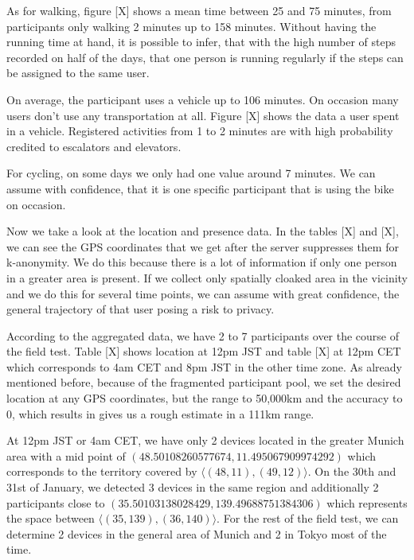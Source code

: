 As for walking, figure [X] shows a mean time between 25 and 75 minutes, from participants only walking 2 minutes up to 158 minutes. Without having the running time at hand, it is possible to infer, that with the high number of steps recorded on half of the days, that one person is running regularly if the steps can be assigned to the same user.

On average, the participant uses a vehicle up to 106 minutes. On occasion many users don't use any transportation at all. Figure [X] shows the data a user spent in a vehicle. Registered activities from 1 to 2 minutes are with high probability credited to escalators and elevators.  

For cycling, on some days we only had one value around 7 minutes. We can assume with confidence, that it is one specific participant that is using the bike on occasion.

Now we take a look at the location and presence data. In the tables [X] and [X], we can see the GPS coordinates that we get after the server suppresses them for k-anonymity. We do this because there is a lot of information if only one person in a greater area is present. If we collect only spatially cloaked area in the vicinity and we do this for several time points, we can assume with great confidence, the general trajectory of that user posing a risk to privacy.

According to the aggregated data, we have 2 to 7 participants over the course of the field test. Table [X] shows location at 12pm JST and table [X] at 12pm CET which corresponds to 4am CET and 8pm JST in the other time zone. As already mentioned before, because of the fragmented participant pool, we set the desired location at any GPS coordinates, but the range to 50,000km and the accuracy to 0, which results in gives us a rough estimate in a 111km range. 

At 12pm JST or 4am CET, we have only 2 devices located in the greater Munich area with a mid point of \((48.50108260577674, 11.495067909974292)\) which corresponds to the territory covered by \(\langle(48, 11),(49, 12)\rangle\). On the 30th and 31st of January, we detected 3 devices in the same region and additionally 2 participants close to \((35.50103138028429, 139.49688751384306)\) which represents the space between \(\langle(35, 139),(36, 140)\rangle\). For the rest of the field test, we can determine 2 devices in the general area of Munich and 2 in Tokyo most of the time.

